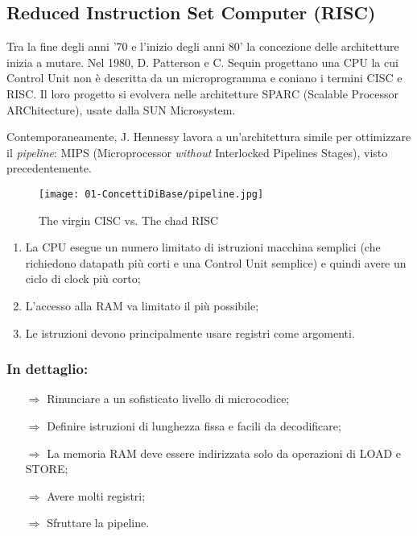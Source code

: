 \subsection{Reduced Instruction Set Computer (RISC)}

Tra la fine degli anni '70 e l'inizio degli anni 80' la concezione delle architetture inizia a mutare. Nel 1980, D. Patterson e C. Sequin progettano una CPU la cui Control Unit non è descritta da un microprogramma e coniano i termini CISC e RISC.
Il loro progetto si evolvera nelle architetture SPARC (Scalable Processor ARChitecture), usate dalla SUN Microsystem. 

Contemporaneamente, J. Hennessy lavora a un'architettura simile per ottimizzare il \textit{pipeline}: MIPS (Microprocessor \textit{without} Interlocked Pipelines Stages), visto precedentemente. 

\begin{figure}[h]
    \centering
    \texttt{[image: 01-ConcettiDiBase/pipeline.jpg]}
    \caption{The virgin CISC vs. The chad RISC}
\end{figure}


\begin{enumerate}
  \item La CPU esegue un numero limitato di istruzioni macchina semplici (che richiedono datapath più corti e una Control Unit semplice) e quindi avere un ciclo di clock più corto;
  \item L'accesso alla RAM va limitato il più possibile;
  \item Le istruzioni devono principalmente usare registri come argomenti.
\end{enumerate}

\subsubsection{In dettaglio:}

\begin{itemize}
  \item [$\Rightarrow$] Rinunciare a un sofisticato livello di microcodice;
  \item [$\Rightarrow$] Definire istruzioni di lunghezza fissa e facili da decodificare;
  \item [$\Rightarrow$] La memoria RAM deve essere indirizzata solo da operazioni di LOAD e STORE;
  \item [$\Rightarrow$] Avere molti registri;
  \item [$\Rightarrow$] Sfruttare la pipeline.
\end{itemize}

